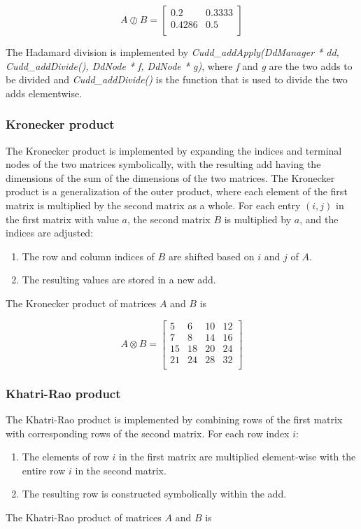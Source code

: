 \[
    A \oslash B = \begin{bmatrix}
        0.2    & 0.3333 \\
        0.4286 & 0.5    \\
    \end{bmatrix}
\]

The Hadamard division is implemented by \textit{Cudd\_addApply(DdManager * dd, Cudd\_addDivide(), DdNode * f, DdNode * g)}, where \textit{f} and \textit{g} are the two \glspl{add} to be divided and \textit{Cudd\_addDivide()} is the function that is used to divide the two \glspl{add} elementwise.

\subsubsection{Kronecker product}
The Kronecker product is implemented by expanding the indices and terminal nodes of the two matrices symbolically, with the resulting \gls{add} having the dimensions of the sum of the dimensions of the two matrices. 
The Kronecker product is a generalization of the outer product, where each element of the first matrix is multiplied by the second matrix as a whole.
For each entry $(i, j)$ in the first matrix with value $a$, the second matrix $B$ is multiplied by $a$, and the indices are adjusted:
\begin{enumerate}
    \item The row and column indices of $B$ are shifted based on $i$ and $j$ of $A$.
    \item The resulting values are stored in a new \gls{add}.
\end{enumerate}
The Kronecker product of matrices $A$ and $B$ is

\[
    A \otimes B = \begin{bmatrix}
        5  & 6  & 10 & 12 \\
        7  & 8  & 14 & 16 \\
        15 & 18 & 20 & 24 \\
        21 & 24 & 28 & 32 \\
    \end{bmatrix}
\]

\subsubsection{Khatri-Rao product}
The Khatri-Rao product is implemented by combining rows of the first matrix with corresponding rows of the second matrix. For each row index $i$:
\begin{enumerate}
    \item The elements of row $i$ in the first matrix are multiplied element-wise with the entire row $i$ in the second matrix.
    \item The resulting row is constructed symbolically within the \gls{add}.   
\end{enumerate}
The Khatri-Rao product of matrices $A$ and $B$ is

